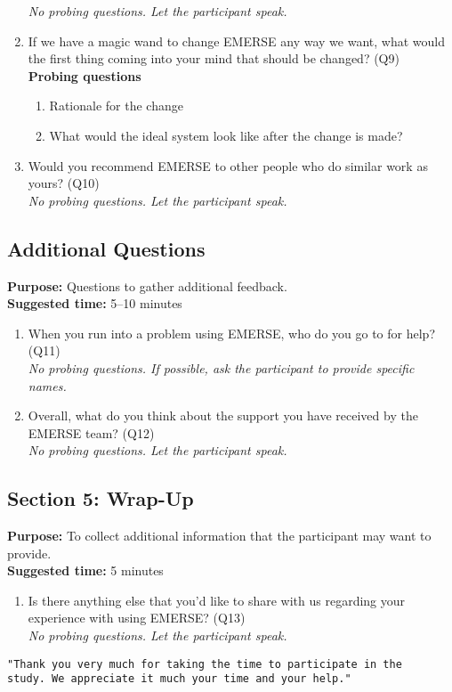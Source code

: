 \begin{enumerate}
        \textit{No probing questions. Let the participant speak.}
    \item If we have a magic wand to change EMERSE any way we want, what would the first thing coming into your mind that should be changed? (Q9) \\
        \textbf{Probing questions}
            \begin{enumerate}
                \item Rationale for the change
                \item What would the ideal system look like after the change is made?
            \end{enumerate}
    \item Would you recommend EMERSE to other people who do similar work as yours? (Q10) \\
        \textit{No probing questions. Let the participant speak.}
\end{enumerate}

\subsection{Additional Questions}
\textbf{Purpose:} Questions to gather additional feedback.\\
\textbf{Suggested time:} 5–10 minutes
\begin{enumerate}
    \item When you run into a problem using EMERSE, who do you go to for help? (Q11) \\
        \textit{No probing questions. If possible, ask the participant to provide specific names.}
    \item Overall, what do you think about the support you have received by the EMERSE team? (Q12) \\
        \textit{No probing questions. Let the participant speak.}
\end{enumerate}

\subsection{Section 5: Wrap-Up}
\textbf{Purpose:} To collect additional information that the participant may want to provide. \\
\textbf{Suggested time:} 5 minutes
\begin{enumerate}
    \item Is there anything else that you’d like to share with us regarding your experience with using EMERSE? (Q13)\\
        \textit{No probing questions. Let the participant speak.}
\end{enumerate}

\begin{verbatim}
"Thank you very much for taking the time to participate in the
study. We appreciate it much your time and your help."
\end{verbatim}



